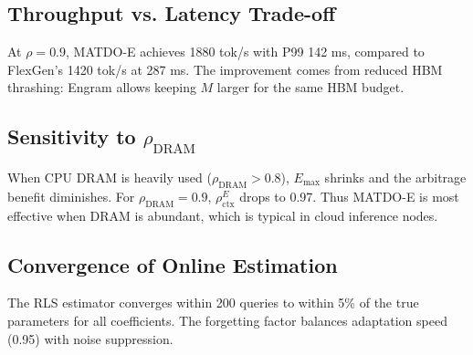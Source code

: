 \documentclass[11pt,a4paper]{article}
\theoremstyle{plain}
\theoremstyle{definition}
\begin{document}
\subsection{Throughput vs. Latency Trade-off}
At $\rho=0.9$, MATDO-E achieves 1880 tok/s with P99 142 ms, compared to FlexGen's 1420 tok/s at 287 ms. The improvement comes from reduced HBM thrashing: Engram allows keeping $M$ larger for the same HBM budget.

\subsection{Sensitivity to $\rho_{\text{DRAM}}$}
When CPU DRAM is heavily used ($\rho_{\text{DRAM}}>0.8$), $E_{\max}$ shrinks and the arbitrage benefit diminishes. For $\rho_{\text{DRAM}}=0.9$, $\rho_{\text{ctx}}^E$ drops to 0.97. Thus MATDO-E is most effective when DRAM is abundant, which is typical in cloud inference nodes.

\subsection{Convergence of Online Estimation}
The RLS estimator converges within 200 queries to within 5\% of the true parameters for all coefficients. The forgetting factor balances adaptation speed (0.95) with noise suppression.
\end{document}
